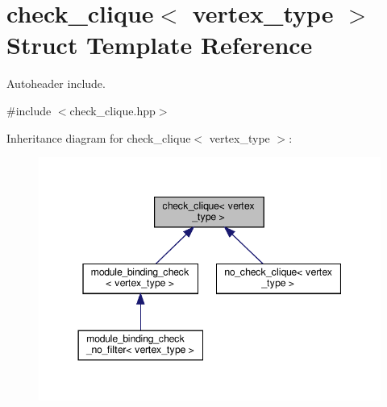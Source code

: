 \hypertarget{structcheck__clique}{}\section{check\+\_\+clique$<$ vertex\+\_\+type $>$ Struct Template Reference}
\label{structcheck__clique}


Autoheader include.  




{\ttfamily \#include $<$check\+\_\+clique.\+hpp$>$}



Inheritance diagram for check\+\_\+clique$<$ vertex\+\_\+type $>$\+:
\nopagebreak
\begin{figure}[H]
\begin{center}
\leavevmode
\includegraphics[width=344pt]{dd/daa/structcheck__clique__inherit__graph}
\end{center}
\end{figure}
